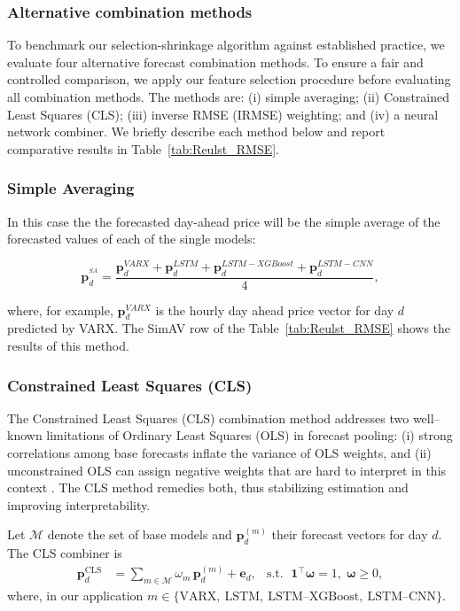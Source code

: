 \documentclass{article}
\begin{document}
\subsubsection{Alternative combination methods}
To benchmark our selection-shrinkage algorithm against established practice, we evaluate four alternative forecast combination methods. To ensure a fair and controlled comparison, we apply our feature selection procedure before evaluating all combination methods. The methods are: (i) simple averaging; (ii) Constrained Least Squares (CLS); (iii) inverse  RMSE (IRMSE) weighting; and (iv) a neural network combiner. We briefly describe each method below and report comparative results in Table~\ref{tab:Reulst_RMSE}.

\subsubsection{Simple Averaging}
In this case the the forecasted day-ahead price will be the simple average of the forecasted values of each of the single models:

\begin{equation}
    \textbf{p}^{^{SA}}_d = \frac{\textbf{p}^{VARX}_d + \textbf{p}^{LSTM}_d + \textbf{p}^{LSTM-XGBoost}_d + \textbf{p}^{LSTM-CNN}_d}{4}, 
\end{equation}

where, for example, $\textbf{p}^{VARX}_d$ is the hourly day ahead price vector for day $d$ predicted by VARX. The SimAV row of the Table~\ref{tab:Reulst_RMSE} shows the results of this method.

\subsubsection{Constrained Least Squares (CLS)}
The Constrained Least Squares (CLS) combination method addresses two well–known limitations of Ordinary Least Squares (OLS) in forecast pooling: (i) strong correlations among base forecasts inflate the variance of OLS weights, and (ii) unconstrained OLS can assign negative weights that are hard to interpret in this context \citep{theil1961pure,lawson1974solving}. The CLS method remedies both, thus stabilizing estimation and improving interpretability.

Let $\mathcal{M}$ denote the set of base models and $\mathbf{p}^{(m)}_d$ their forecast vectors for day $d$. The CLS combiner is
\begin{align}
\mathbf{p}^{\text{CLS}}_d &= \sum_{m\in\mathcal{M}} \omega_m\, \mathbf{p}^{(m)}_d + \mathbf{e}_d, 
& \text{s.t. }\; \mathbf{1}^\top \boldsymbol{\omega}=1,\;\boldsymbol{\omega}\ge 0, \label{eq:cls}
\end{align}
where, in our application $m\in\{\text{VARX},\ \text{LSTM},\ \allowbreak \text{LSTM--XGBoost},\ \allowbreak \text{LSTM--CNN}\}$.
\end{document}
